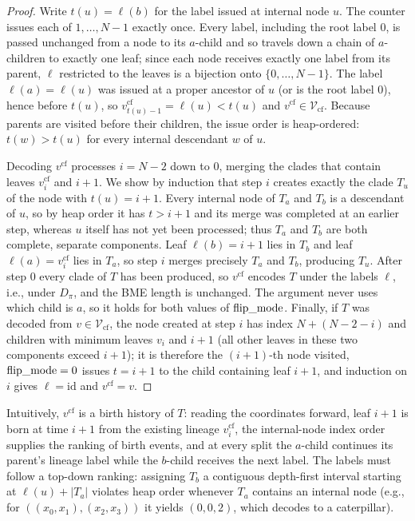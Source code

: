 \documentclass[11pt,a4paper]{article}
\makeatletter
\DeclareRobustCommand{\_}{\ifmmode\nfss@text{\textunderscore}\else\textunderscore\allowbreak\fi}
\theoremstyle{definition}
\makeatother
\begin{document}
\begin{proof}
Write $t(u) = \ell(b)$ for the label issued at internal node $u$. The counter issues each of $1, \dots, N-1$ exactly once. Every label, including the root label $0$, is passed unchanged from a node to its $a$-child and so travels down a chain of $a$-children to exactly one leaf; since each node receives exactly one label from its parent, $\ell$ restricted to the leaves is a bijection onto $\{0, \dots, N-1\}$. The label $\ell(a) = \ell(u)$ was issued at a proper ancestor of $u$ (or is the root label $0$), hence before $t(u)$, so $v^{\text{cf}}_{t(u)-1} = \ell(u) < t(u)$ and $v^{\text{cf}} \in \mathcal{V}_{\text{cf}}$. Because parents are visited before their children, the issue order is heap-ordered: $t(w) > t(u)$ for every internal descendant $w$ of $u$.

Decoding $v^{\text{cf}}$ processes $i = N-2$ down to $0$, merging the clades that contain leaves $v^{\text{cf}}_i$ and $i+1$. We show by induction that step $i$ creates exactly the clade $T_u$ of the node with $t(u) = i + 1$. Every internal node of $T_a$ and $T_b$ is a descendant of $u$, so by heap order it has $t > i + 1$ and its merge was completed at an earlier step, whereas $u$ itself has not yet been processed; thus $T_a$ and $T_b$ are both complete, separate components. Leaf $\ell(b) = i + 1$ lies in $T_b$ and leaf $\ell(a) = v^{\text{cf}}_i$ lies in $T_a$, so step $i$ merges precisely $T_a$ and $T_b$, producing $T_u$. After step $0$ every clade of $T$ has been produced, so $v^{\text{cf}}$ encodes $T$ under the labels $\ell$, i.e., under $D_\pi$, and the BME length is unchanged. The argument never uses which child is $a$, so it holds for both values of $\text{flip\_mode}$. Finally, if $T$ was decoded from $v \in \mathcal{V}_{\text{cf}}$, the node created at step $i$ has index $N + (N-2-i)$ and children with minimum leaves $v_i$ and $i + 1$ (all other leaves in these two components exceed $i+1$); it is therefore the $(i+1)$-th node visited, $\text{flip\_mode} = 0$ issues $t = i + 1$ to the child containing leaf $i+1$, and induction on $i$ gives $\ell = \text{id}$ and $v^{\text{cf}} = v$.
\end{proof}
Intuitively, $v^{\text{cf}}$ is a birth history of $T$: reading the coordinates forward, leaf $i+1$ is born at time $i+1$ from the existing lineage $v^{\text{cf}}_i$, the internal-node index order supplies the ranking of birth events, and at every split the $a$-child continues its parent's lineage label while the $b$-child receives the next label. The labels must follow a top-down ranking: assigning $T_b$ a contiguous depth-first interval starting at $\ell(u) + |T_a|$ violates heap order whenever $T_a$ contains an internal node (e.g., for $((x_0, x_1), (x_2, x_3))$ it yields $(0, 0, 2)$, which decodes to a caterpillar).
\end{document}
